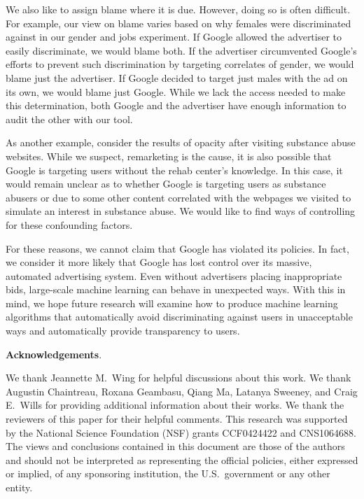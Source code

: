 \documentclass{article}
\makeatletter
\newcommand\gobblepars{\@ifnextchar\par {\expandafter\gobblepars\@gobble}{}}
\renewcommand{\paragraph}[1]{\smallskip\noindent\textbf{#1}.\ \ \gobblepars}
\makeatother
\begin{document}
We also like to assign blame where it is due.  However, doing so is often difficult.
For example, our view on blame varies based on why females were discriminated against in our gender and jobs experiment.
If Google allowed the advertiser to easily discriminate, we would blame both.
If the advertiser circumvented Google's efforts to prevent such discrimination by targeting correlates of gender, we would blame just the advertiser.
If Google decided to target just males with the ad on its own, we would blame just Google.
While we lack the access needed to make this determination, both Google and the advertiser have enough information to audit the other with our tool.







As another example, consider the results of opacity after visiting substance abuse websites.
While we suspect, remarketing is the cause, it is also possible that Google is targeting users without the rehab center's knowledge.  
In this case, it would remain unclear as to whether Google is targeting users as substance abusers or due to some other content correlated with the webpages we visited to simulate an interest in substance abuse.
We would like to find ways of controlling for these confounding factors.







For these reasons, we cannot claim that Google has violated its policies.  
In fact, we consider it more likely that Google has lost control over its massive, automated advertising system. 
Even without advertisers placing inappropriate bids, large-scale machine learning can behave in unexpected ways.  
With this in mind, we hope future research will examine how to produce machine learning algorithms that automatically avoid discriminating against users in unacceptable ways and automatically provide transparency to users. 







\paragraph{Acknowledgements}
We thank Jeannette M.\ Wing for helpful discussions about this work.
We thank Augustin Chaintreau, Roxana Geambasu, Qiang Ma, Latanya Sweeney, and Craig E.\ Wills for providing additional information about their works.
We thank the reviewers of this paper for their helpful comments.
This research was supported by the National Science Foundation (NSF) grants CCF0424422 and CNS1064688.
The views and conclusions contained in this document are those of the authors and should not be interpreted as representing the official policies, either expressed or implied, of any sponsoring institution, the U.S.\ government or any other entity.
\end{document}
